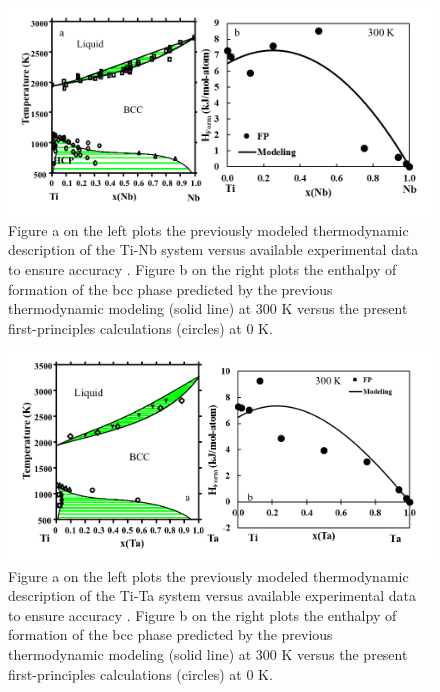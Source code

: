 \newpage
\begin{figure}[H]
	\centering
	\includegraphics[width=\textwidth]{Chapter-3/Figures/TiNb.png}
	\caption{Figure a on the left plots the previously modeled thermodynamic description of the Ti-Nb system versus available experimental data to ensure accuracy \cite{Zhang2001,Kumar1994}. Figure b on the right plots the enthalpy of formation of the bcc phase predicted by the previous thermodynamic modeling (solid line) at 300 K versus the present first-principles calculations (circles) at 0 K.}
	\label{Ch3-figure:TiNb}
\end{figure}

\newpage
\begin{figure}[H]
	\centering
	\includegraphics[width=\textwidth]{Chapter-3/Figures/TiTa.png}
	\caption{Figure a on the left plots the previously modeled thermodynamic description of the Ti-Ta system versus available experimental data to ensure accuracy \cite{Ansara1998,Murray1987}. Figure b on the right plots the enthalpy of formation of the bcc phase predicted by the previous thermodynamic modeling (solid line) at 300 K versus the present first-principles calculations (circles) at 0 K.}
	\label{Ch3-figure:TiTa}
\end{figure}

